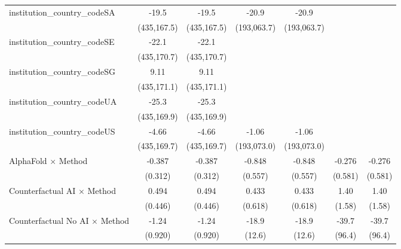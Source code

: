 \begin{tabular}{lcccccc}
   institution\_country\_codeSA          & -19.5         & -19.5         & -20.9         & -20.9         &             &   \\   
                                         & (435,167.5)   & (435,167.5)   & (193,063.7)   & (193,063.7)   &             &   \\   
   institution\_country\_codeSE          & -22.1         & -22.1         &               &               &             &   \\   
                                         & (435,170.7)   & (435,170.7)   &               &               &             &   \\   
   institution\_country\_codeSG          & 9.11          & 9.11          &               &               &             &   \\   
                                         & (435,171.1)   & (435,171.1)   &               &               &             &   \\   
   institution\_country\_codeUA          & -25.3         & -25.3         &               &               &             &   \\   
                                         & (435,169.9)   & (435,169.9)   &               &               &             &   \\   
   institution\_country\_codeUS          & -4.66         & -4.66         & -1.06         & -1.06         &             &   \\   
                                         & (435,169.7)   & (435,169.7)   & (193,073.0)   & (193,073.0)   &             &   \\   
   AlphaFold $\times$ Method             & -0.387        & -0.387        & -0.848        & -0.848        & -0.276      & -0.276\\   
                                         & (0.312)       & (0.312)       & (0.557)       & (0.557)       & (0.581)     & (0.581)\\   
   Counterfactual AI $\times$ Method     & 0.494         & 0.494         & 0.433         & 0.433         & 1.40        & 1.40\\   
                                         & (0.446)       & (0.446)       & (0.618)       & (0.618)       & (1.58)      & (1.58)\\   
   Counterfactual No AI $\times$ Method  & -1.24         & -1.24         & -18.9         & -18.9         & -39.7       & -39.7\\   
                                         & (0.920)       & (0.920)       & (12.6)        & (12.6)        & (96.4)      & (96.4)\\   

\end{tabular}

